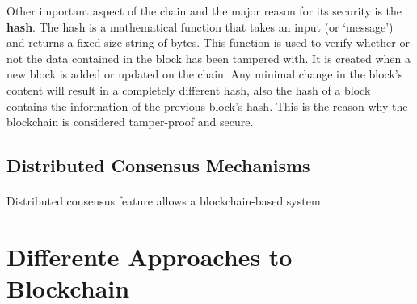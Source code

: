 Other important aspect of the chain and the major reason for its security is the \textbf{hash}. The hash is a mathematical function that takes an input (or `message') and returns a fixed-size string of bytes.
This function is used to verify whether or not the data contained in the block has been tampered with. It is created when a new block is added or updated on the chain. Any minimal change in the
block's content will result in a completely different hash, also the hash of a block contains the information of the previous block's hash.
This is the reason why the blockchain is considered tamper-proof and secure.

\subsection*{Distributed Consensus Mechanisms}\label{subsec:distributed-consensus-mechanisms}
\paragraph{}

Distributed consensus feature allows a blockchain-based system


\section{Differente Approaches to Blockchain}\label{sec:different-approaches-to-blockchain}
\paragraph{}




